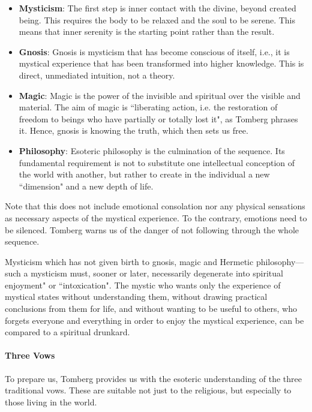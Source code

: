 \begin{itemize}
\item \textbf{Mysticism}: The first step is inner contact with the divine, beyond created being. This requires the body to be relaxed and the soul to be serene. This means that inner serenity is the starting point rather than the result. 
\item \textbf{Gnosis}: Gnosis is mysticism that has become conscious of itself, i.e., it is mystical experience that has been transformed into higher knowledge. This is direct, unmediated intuition, not a theory. 
\item \textbf{Magic}: Magic is the power of the invisible and spiritual over the visible and material. The aim of magic is ``liberating action, i.e. the restoration of freedom to beings who have partially or totally lost it", as Tomberg phrases it. Hence, gnosis is knowing the truth, which then sets us free. 
\item \textbf{Philosophy}: Esoteric philosophy is the culmination of the sequence. Its fundamental requirement is not to substitute one intellectual conception of the world with another, but rather to create in the individual a new ``dimension" and a new depth of life. 
\end{itemize}
Note that this does not include emotional consolation nor any physical sensations as necessary aspects of the mystical experience. To the contrary, emotions need to be silenced. Tomberg warns us of the danger of not following through the whole sequence.

\begin{quotex}
Mysticism which has not given birth to gnosis, magic and Hermetic philosophy—such a mysticism must, sooner or later, necessarily degenerate into spiritual enjoyment" or ``intoxication". The mystic who wants only the experience of mystical states without understanding them, without drawing practical conclusions from them for life, and without wanting to be useful to others, who forgets everyone and everything in order to enjoy the mystical experience, can be compared to a spiritual drunkard. 

\end{quotex}
\paragraph{Three Vows}
To prepare us, Tomberg provides us with the esoteric understanding of the three traditional vows. These are suitable not just to the religious, but especially to those living in the world.

